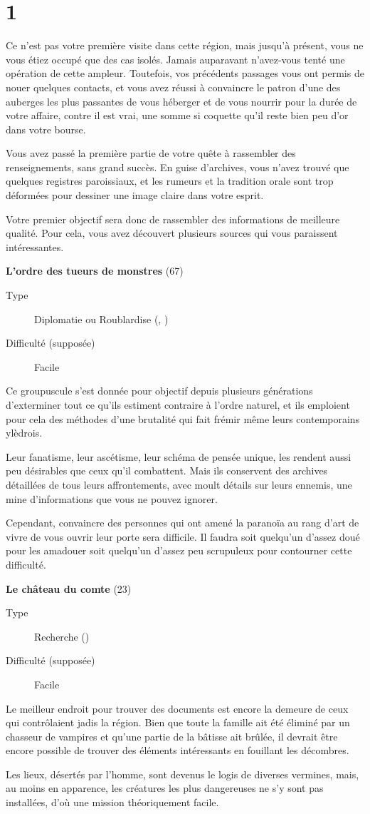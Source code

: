 \documentclass{report}
\newcommand{\gsection}[1]{
    \section{#1}
    \label{section-#1}
}
\newcommand{\quest}[5]{
    \begin{mdframed}[innertopmargin=0.5cm,innerbottommargin=0.5cm,leftmargin=0.5cm,rightmargin=0.5cm]
        \begin{center}
            \textbf{#1} (#2)
        \end{center}
        \begin{description}
            \item[Type] #3
            \item[Difficulté (supposée)] #4
        \end{description}
        #5
    \end{mdframed}
}
\begin{document}
\gsection{1}

Ce n'est pas votre première visite dans cette région, mais jusqu'à présent, vous ne vous étiez occupé que des cas isolés. Jamais auparavant n'avez-vous tenté une opération de cette ampleur. Toutefois, vos précédents passages vous ont permis de nouer quelques contacts, et vous avez réussi à convaincre le patron d'une des auberges les plus passantes de vous héberger et de vous nourrir pour la durée de votre affaire, contre il est vrai, une somme si coquette qu'il reste bien peu d'or dans votre bourse.

Vous avez passé la première partie de votre quête à rassembler des renseignements, sans grand succès. En guise d'archives, vous n'avez trouvé que quelques registres paroissiaux, et les rumeurs et la tradition orale sont trop déformées pour dessiner une image claire dans votre esprit.

Votre premier objectif sera donc de rassembler des informations de meilleure qualité. Pour cela, vous avez découvert plusieurs sources qui vous paraissent intéressantes.

\quest{L'ordre des tueurs de monstres}{67}{Diplomatie ou Roublardise (\ankh, \cross)}{Facile}{
Ce groupuscule s'est donnée pour objectif depuis plusieurs générations d'exterminer tout ce qu'ils estiment contraire à l'ordre naturel, et ils emploient pour cela des méthodes d'une brutalité qui fait frémir même leurs contemporains ylèdrois.

Leur fanatisme, leur ascétisme, leur schéma de pensée unique, les rendent aussi peu désirables que ceux qu'il combattent. Mais ils conservent des archives détaillées de tous leurs affrontements, avec moult détails sur leurs ennemis, une mine d'informations que vous ne pouvez ignorer.

Cependant, convaincre des personnes qui ont amené la paranoïa au rang d'art de vivre de vous ouvrir leur porte sera difficile. Il faudra soit quelqu'un d'assez doué pour les amadouer soit quelqu'un d'assez peu scrupuleux pour contourner cette difficulté.
}

\clearpage

\quest{Le château du comte}{23}{Recherche (\ankh)}{Facile}{
Le meilleur endroit pour trouver des documents est encore la demeure de ceux qui contrôlaient jadis la région. Bien que toute la famille ait été éliminé par un chasseur de vampires et qu'une partie de la bâtisse ait brûlée, il devrait être encore possible de trouver des éléments intéressants en fouillant les décombres.

Les lieux, désertés par l'homme, sont devenus le logis de diverses vermines, mais, au moins en apparence, les créatures les plus dangereuses ne s'y sont pas installées, d'où une mission théoriquement facile.
}
\end{document}
